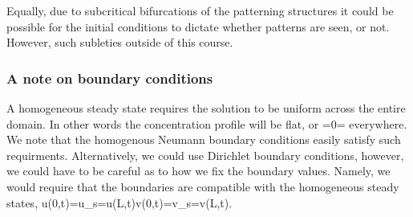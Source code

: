 Equally, due to subcritical bifurcations of the patterning structures it could be possible for the initial conditions to dictate whether patterns are seen, or not. However, such subleties outside of this course.


\subsubsection{A note on boundary conditions}
A homogeneous steady state requires the solution to be uniform across the entire domain. In other words the concentration profile will be flat, or
\bb
{}=0=
\ee
everywhere. We note that the homogenous Neumann boundary conditions easily satisfy such requirments. Alternatively, we could use Dirichlet boundary conditions, however, we could have to be careful as to how we fix the boundary values. Namely, we would require that the boundaries are compatible with the homogeneous steady states,
\bb
u(0,t)=u_s=u(L,t)\quad v(0,t)=v_s=v(L,t).
\ee

